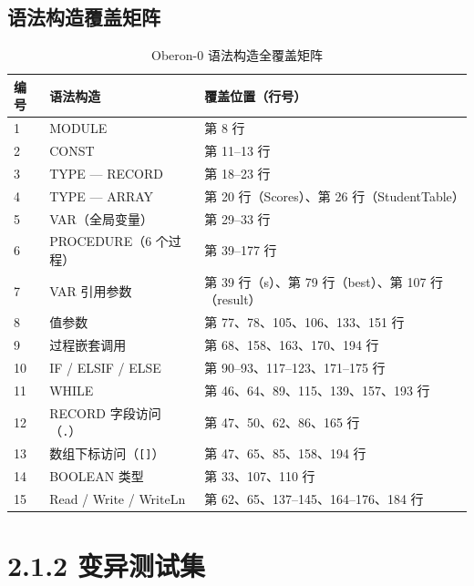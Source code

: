 \documentclass[a4paper]{article}
\begin{document}
\lstset{language=Pascal,basicstyle=\ttfamily\footnotesize}


\subsection{语法构造覆盖矩阵}

\begin{table}[H]
\centering
\caption{Oberon-0 语法构造全覆盖矩阵}
\begin{tabular}{@{}lll@{}}
\toprule
\textbf{编号} & \textbf{语法构造} & \textbf{覆盖位置（行号）} \\
\midrule
1  & MODULE               & 第 8 行                    \\
2  & CONST                & 第 11--13 行               \\
3  & TYPE — RECORD        & 第 18--23 行               \\
4  & TYPE — ARRAY         & 第 20 行（Scores）、第 26 行（StudentTable） \\
5  & VAR（全局变量）       & 第 29--33 行              \\
6  & PROCEDURE（6 个过程） & 第 39--177 行             \\
7  & VAR 引用参数          & 第 39 行（s）、第 79 行（best）、第 107 行（result） \\
8  & 值参数                & 第 77、78、105、106、133、151 行 \\
9  & 过程嵌套调用          & 第 68、158、163、170、194 行 \\
10 & IF / ELSIF / ELSE     & 第 90--93、117--123、171--175 行 \\
11 & WHILE                 & 第 46、64、89、115、139、157、193 行 \\
12 & RECORD 字段访问（\texttt{.}） & 第 47、50、62、86、165 行 \\
13 & 数组下标访问（\texttt{[]}）  & 第 47、65、85、158、194 行  \\
14 & BOOLEAN 类型           & 第 33、107、110 行          \\
15 & Read / Write / WriteLn & 第 62、65、137--145、164--176、184 行 \\
\bottomrule
\end{tabular}
\end{table}

\section{2.1.2 变异测试集}
\end{document}
